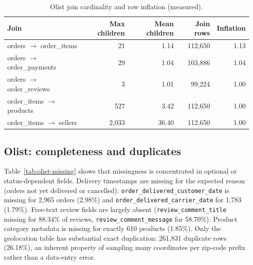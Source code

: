 \documentclass[11pt,a4paper]{article}
\newcommand{\code}[1]{\texttt{#1}}
\begin{document}
\begin{table}[H]
\centering
\small
\caption{Olist join cardinality and row inflation (measured).}
\label{tab:olist-joins}
\begin{tabular}{lrrrr}
\toprule
\textbf{Join} & \textbf{Max children} & \textbf{Mean children} & \textbf{Join rows} & \textbf{Inflation} \\
\midrule
orders $\rightarrow$ order\_items & 21 & 1.14 & 112{,}650 & 1.13 \\
orders $\rightarrow$ order\_payments & 29 & 1.04 & 103{,}886 & 1.04 \\
orders $\rightarrow$ order\_reviews & 3 & 1.01 & 99{,}224 & 1.00 \\
order\_items $\rightarrow$ products & 527 & 3.42 & 112{,}650 & 1.00 \\
order\_items $\rightarrow$ sellers & 2{,}033 & 36.40 & 112{,}650 & 1.00 \\
\bottomrule
\end{tabular}
\end{table}

\subsection{Olist: completeness and duplicates}
Table~\ref{tab:olist-missing} shows that missingness is concentrated in optional or status-dependent fields. Delivery timestamps are missing for the expected reason (orders not yet delivered or cancelled): \code{order\_delivered\_customer\_date} is missing for 2{,}965 orders (2.98\%) and \code{order\_delivered\_carrier\_date} for 1{,}783 (1.79\%). Free-text review fields are largely absent (\code{review\_comment\_title} missing for 88.34\% of reviews, \code{review\_comment\_message} for 58.70\%). Product category metadata is missing for exactly 610 products (1.85\%). Only the geolocation table has substantial exact duplication: 261{,}831 duplicate rows (26.18\%), an inherent property of sampling many coordinates per zip-code prefix rather than a data-entry error.
\end{document}
